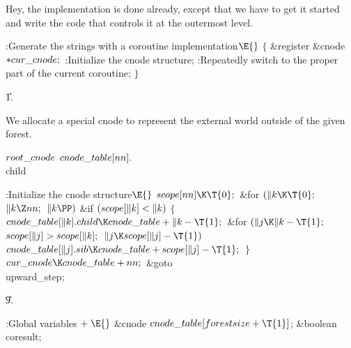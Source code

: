 Hey, the implementation is done already, except that we have to
get it started and write the code that controls it at the outermost level.

\Y\B\4:Generate the strings with a coroutine implementation\X${}\E{}$\6
${}\{{}$\1\6
\&{register} \&{cnode} ${}{*}\\{cur\_cnode};{}$\7
:Initialize the cnode structure\X;\6
:Repeatedly switch to the proper part of the current coroutine\X;\6
\4${}\}{}$\2\par
\U1.\fi

We allocate a special cnode to represent the external world outside of
the
given forest.

\Y\B\4\D$\\{root\_cnode}$ \5
$\\{cnode\_table}[\\{nn}].{}$\\{child}\par
\Y\B\4:Initialize the cnode structure\X${}\E{}$\6
$\\{scope}[\\{nn}]\K\T{0};{}$\6
\&{for} ${}(\|k\K\T{0};{}$ ${}\|k\Z\\{nn};{}$ ${}\|k\PP){}$\1\6
\&{if} ${}(\\{scope}[\|k]<\|k){}$\5
${}\{{}$\1\6
${}\\{cnode\_table}[\|k].\\{child}\K\\{cnode\_table}+\|k-\T{1};{}$\6
\&{for} ${}(\|j\K\|k-\T{1};{}$ ${}\\{scope}[\|j]>\\{scope}[\|k];{}$ ${}\|j\K%
\\{scope}[\|j]-\T{1}){}$\1\5
${}\\{cnode\_table}[\|j].\\{sib}\K\\{cnode\_table}+\\{scope}[\|j]-\T{1};{}$\2\6
\4${}\}{}$\2\2\6
${}\\{cur\_cnode}\K\\{cnode\_table}+\\{nn};{}$\6
\&{goto} \\{upward\_step};\par
\U9.\fi

\B{}:Global variables\X${}\mathrel+\E{}$\6
\&{cnode} ${}\\{cnode\_table}[\\{forestsize}+\T{1}]{}$;\6
\&{boolean} \\{coresult};\par
\fi

